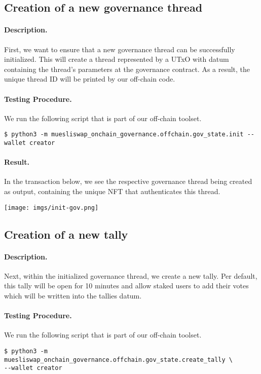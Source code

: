 \documentclass[11pt]{article}
\begin{document}
\subsection{Creation of a new governance thread}
\paragraph{Description.} First, we want to ensure that a new governance thread can be successfully initialized. This will create a thread represented by a UTxO with datum containing the thread's parameters at the governance contract. As a result, the unique thread ID will be printed by our off-chain code.
\paragraph{Testing Procedure.} We run the following script that is part of our off-chain toolset.
\begin{verbatim}
$ python3 -m muesliswap_onchain_governance.offchain.gov_state.init --wallet creator
\end{verbatim}
\paragraph{Result.} In the transaction below, we see the respective governance thread being created as output, containing the unique NFT that authenticates this thread.
\bigskip

\texttt{[image: imgs/init-gov.png]}


\subsection{Creation of a new tally}
\paragraph{Description.} Next, within the initialized governance thread, we create a new tally. Per default, this tally will be open for 10 minutes and allow staked users to add their votes which will be written into the tallies datum.

\paragraph{Testing Procedure.} We run the following script that is part of our off-chain toolset.
\begin{verbatim}
$ python3 -m muesliswap_onchain_governance.offchain.gov_state.create_tally \
--wallet creator
\end{verbatim}
\end{document}
